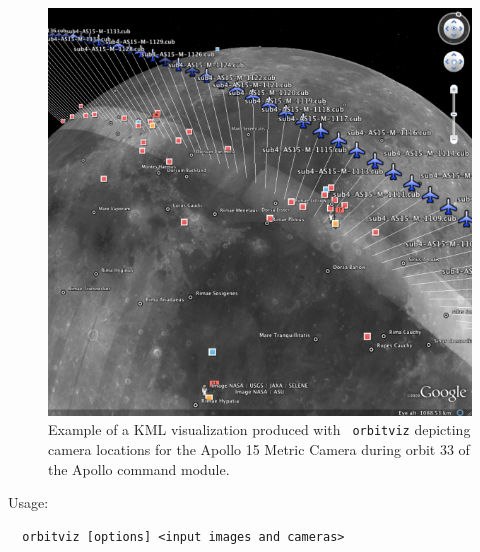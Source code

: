 \begin{figure}[!b]
  \begin{center}
  \includegraphics[width=6in]{images/orbitviz_ge_result_600px.png}
  \end{center}
  \caption{ Example of a \ac{KML} visualization produced with {\tt
      orbitviz} depicting camera locations for the Apollo 15 Metric
    Camera during orbit 33 of the Apollo command module.}
  \label{fig:orbitviz_example}
\end{figure}

Usage:
\begin{verbatim}
  orbitviz [options] <input images and cameras> 
\end{verbatim}

